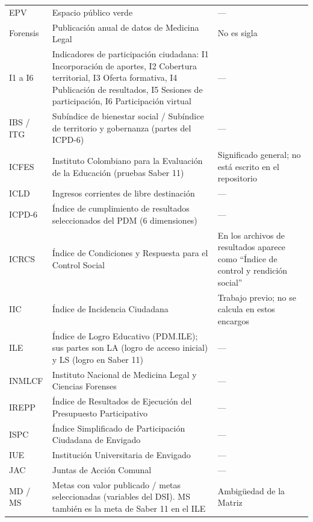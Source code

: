 \documentclass[11pt,letterpaper]{article}
\begin{document}
{\begin{xltabular}{\linewidth}{L{2.56cm}L{8.91cm}L{4.46cm}}
EPV & Espacio público verde & --- \\
Forensis & Publicación anual de datos de Medicina Legal & No es sigla \\
I1 a I6 & Indicadores de participación ciudadana: I1 Incorporación de aportes, I2 Cobertura territorial, I3 Oferta formativa, I4 Publicación de resultados, I5 Sesiones de participación, I6 Participación virtual & --- \\
IBS / ITG & Subíndice de bienestar social / Subíndice de territorio y gobernanza (partes del ICPD-6) & --- \\
ICFES & Instituto Colombiano para la Evaluación de la Educación (pruebas Saber 11) & Significado general; no está escrito en el repositorio \\
ICLD & Ingresos corrientes de libre destinación & --- \\
ICPD-6 & Índice de cumplimiento de resultados seleccionados del PDM (6 dimensiones) & --- \\
ICRCS & Índice de Condiciones y Respuesta para el Control Social & En los archivos de resultados aparece como ``Índice de control y rendición social'' \\
IIC & Índice de Incidencia Ciudadana & Trabajo previo; no se calcula en estos encargos \\
ILE & Índice de Logro Educativo (PDM.ILE); sus partes son LA (logro de acceso inicial) y LS (logro en Saber 11) & --- \\
INMLCF & Instituto Nacional de Medicina Legal y Ciencias Forenses & --- \\
IREPP & Índice de Resultados de Ejecución del Presupuesto Participativo & --- \\
ISPC & Índice Simplificado de Participación Ciudadana de Envigado & --- \\
IUE & Institución Universitaria de Envigado & --- \\
JAC & Juntas de Acción Comunal & --- \\
MD / MS & Metas con valor publicado / metas seleccionadas (variables del DSI). MS también es la meta de Saber 11 en el ILE & Ambigüedad de la Matriz \\

\end{xltabular}}
\end{document}
